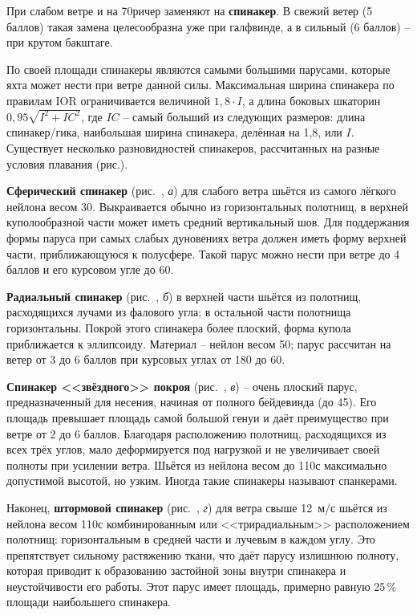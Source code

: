 При слабом ветре и на 70\gr ричер заменяют на \textbf{спинакер}. В
свежий ветер (5 баллов) такая замена целесообразна уже при галфвинде,
а в сильный (6 баллов) \--- при крутом бакштаге.

По своей площади спинакеры являются самыми большими парусами, которые
яхта может нести при ветре данной силы. Максимальная ширина спинакера
по правилам IOR ограничивается величиной $1,8 \cdot I$, а длина
боковых шкаторин $0,95 \sqrt{I^2 + IC^2}$, где $IC$ \--- самый больший
из следующих размеров: длина спинакер\-/гика, наибольшая ширина
спинакера, делённая на 1,8, или $I$. Существует несколько
разновидностей спинакеров, рассчитанных на разные условия плавания
(рис.).

\textbf{Сферический спинакер}
(рис.~, \textit{а}) для слабого ветра шьётся из самого лёгкого
нейлона весом 30\gmsq. Выкраивается обычно из горизонтальных полотнищ,
в верхней куполообразной части может иметь средний вертикальный
шов. Для поддержания формы паруса при самых слабых дуновениях ветра
должен иметь форму верхней части, приближающуюся к полусфере. Такой
парус можно нести при ветре до 4 баллов и его курсовом угле до 60\gr.

\textbf{Радиальный спинакер}
(рис.~, \textit{б}) в верхней части шьётся из полотнищ,
расходящихся лучами из фалового угла; в остальной части полотнища
горизонтальны. Покрой этого спинакера более плоский, форма купола
приближается к эллипсоиду. Материал \--- нейлон весом 50\gmsq;
парус рассчитан на ветер от 3 до 6 баллов при курсовых углах от 180\gr
до 60\gr.

\textbf{Спинакер <<звёздного>> покроя}
(рис.~, \textit{в}) \--- очень плоский парус, предназначенный
для несения, начиная от полного бейдевинда (до 45\gr). Его площадь
превышает площадь самой большой генуи и даёт преимущество при ветре от
2 до 6 баллов. Благодаря расположению полотнищ, расходящихся из всех
трёх углов, мало деформируется под нагрузкой и не увеличивает своей
полноты при усилении ветра. Шьётся из нейлона весом до 110\gmsq с
максимально допустимой высотой, но узким. Иногда такие спинакеры
называют спанкерами.

Наконец, \textbf{штормовой спинакер}
(рис.~, \textit{г}) для ветра свыше 12~м/с шьётся из нейлона
весом 110\gmsq с комбинированным или <<трирадиальным>> расположением
полотнищ: горизонтальным в средней части и лучевым в каждом углу. Это
препятствует сильному растяжению ткани, что даёт парусу излишнюю
полноту, которая приводит к образованию застойной зоны внутри
спинакера и неустойчивости его работы. Этот парус имеет площадь,
примерно равную 25\,\% площади наибольшего спинакера.

